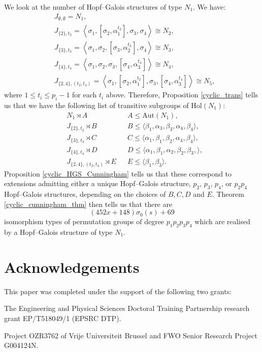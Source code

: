 \documentclass[a4paper,reqno]{amsart}
\theoremstyle{definition}
\newcommand{\Aut}{\mathrm{Aut}}
\newcommand{\Hol}{\mathrm{Hol}}
\begin{document}
We look at the number of Hopf--Galois structures of type $N_1$. We have:
\begin{align*}
    &J_{\emptyset,\emptyset}=N_1,\\
    &J_{\{2\},t_2}=\left\langle \sigma_1, \left[\sigma_2,\alpha_1^{t_2}\right], \sigma_3,\sigma_4\right\rangle \cong N_2,\\
    &J_{\{3\},t_3}=\left\langle \sigma_1, \sigma_2, \left[\sigma_3,\alpha_2^{t_3}\right], \sigma_4 \right\rangle \cong N_3,\\
    &J_{\{4\},t_4}=\left\langle \sigma_1, \sigma_2, \sigma_3, \left[\sigma_4,\alpha_3^{t_4}\right] \right\rangle \cong N_4,\\
    &J_{\{2,4\},(t_2,t_4)}=\left\langle \sigma_1, \left[\sigma_2,\alpha_1^{t_2}\right], \sigma_3, \left[\sigma_4,\alpha_3^{t_4}\right] \right\rangle \cong N_5,
\end{align*}
where $1 \leq t_i \leq p_i-1$ for each $t_i$ above. Therefore, Proposition \ref{cyclic_trans} tells us that we have the following list of transitive subgroups of $\Hol(N_1)$:
\begin{align*}
    &N_1 \rtimes A               && A \leq \Aut(N_1),\\
    &J_{\{2\},t_2} \rtimes B   && B \leq \langle \beta_1,\alpha_3,\beta_3, \alpha_4,\beta_4 \rangle,\\
    &J_{\{3\},t_3} \rtimes C   && C \leq \langle \alpha_1,\beta_1,\beta_2, \alpha_4,\beta_4 \rangle,\\
    &J_{\{4\},t_4} \rtimes D   && D \leq \langle \alpha_1,\beta_1, \alpha_2, \beta_2, \beta_3, \rangle,\\
    &J_{\{2,4\},(t_2,t_4)} \rtimes E && E \leq \langle \beta_1,\beta_3 \rangle.
\end{align*}
Proposition \ref{cyclic_HGS_Cunningham} tells us that these correspond to extensions admitting either a unique Hopf--Galois structure, $p_2$, $p_3$, $p_4$, or $p_2p_4$ Hopf--Galois structures, depending on the choices of $B,C,D$ and $E$. Theorem \ref{cyclic_cunningham_thm} then tells us that there are
\[(452x+148)\sigma_0(s)+69\]
isomorphism types of permutation groups of degree $p_1p_2p_3p_4$ which are realised by a Hopf--Galois structure of type $N_1$. 

\section*{Acknowledgements}
This paper was completed under the support of the following two grants:

The Engineering and Physical Sciences Doctoral Training Partnership research grant EP/T518049/1 (EPSRC DTP).

Project OZR3762 of Vrije Universiteit
Brussel and FWO Senior Research Project G004124N.


\end{document}

